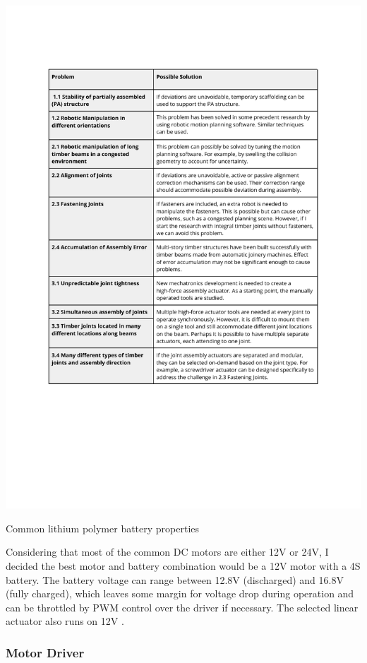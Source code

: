 \begin{table}[]
    \includegraphics[page=3, trim=25.4mm 210mm 25.4mm 33mm, clip, width=\textwidth]{tables/Tables in Chapter 4.pdf}
    \caption{Common lithium polymer battery properties}
    \label{table:common-lipo-properties}
\end{table}

Considering that most of the common DC motors are either 12V or 24V, I decided the best motor and battery combination would be a 12V motor with a 4S battery. The battery voltage can range between 12.8V (discharged) and 16.8V (fully charged), which leaves some margin for voltage drop during operation and can be throttled by PWM control over the driver if necessary. The selected linear actuator also runs on 12V .

\subsubsection{Motor Driver}
\label{subsubsection:exploration-1-motor-driver}

